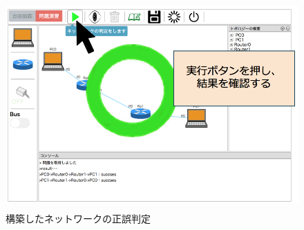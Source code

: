\begin{figure}[htbp]
  \begin{center}
    \includegraphics[clip,width=12.0cm,height=8.0cm]{img/operation03.png}
    \caption{構築したネットワークの正誤判定}
    \label{fig:ope03}
  \end{center}
\end{figure}
